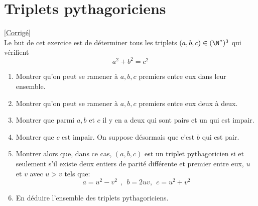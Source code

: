 \documentclass[8pt]{book}
\begin{document}
\section{Triplets pythagoriciens }
\label{Triplets pythagoriciens}
\textcolor{blue}{\hyperref[Triplets pythagoriciens corrigé]{[Corrigé]}}\\
Le but de cet exercice est de déterminer tous les triplets $(a,b,c)\in (\N^*)^3$ qui vérifient
$$a^2+b^2=c^2$$
\begin{enumerate}
	\item Montrer qu'on peut se ramener à $a,b,c$ premiers entre eux dans leur ensemble.
	\item Montrer qu'on peut se ramener à $a,b,c$ premiers entre eux deux à deux.
	\item Montrer que parmi $a,b$ et $c$ il y en a deux qui sont pairs et un qui est impair.
	\item Montrer que $c$ est impair. On suppose désormais que c'est $b$ qui est pair.
	\item Montrer alors que, dans ce cas, $(a,b,c)$ est un triplet pythagoricien si et seulement s'il existe deux entiers de parité différente et premier entre eux, $u$ et $v$ avec $u>v$ tels que:
	$$a=u^2-v^2\ \ ,\ \ b=2uv,\ \ c=u^2+v^2$$
	\item En déduire l'ensemble des triplets pythagoriciens.
\end{enumerate}
\end{document}
